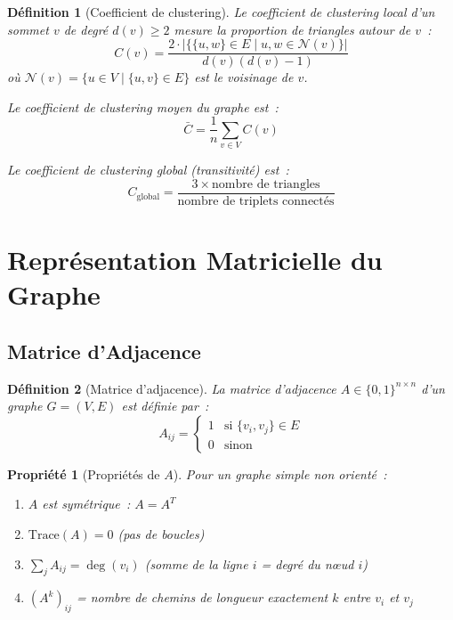 \documentclass[12pt,a4paper]{article}
\newtheorem{definition}{Définition}[section]
\newtheorem{propriete}{Propriété}[section]
\begin{document}
\begin{definition}[Coefficient de clustering]
Le \emph{coefficient de clustering local} d'un sommet $v$ de degré $d(v) \geq 2$ mesure la proportion de triangles autour de $v$~:
\[
    C(v) = \frac{2 \cdot |\{\{u, w\} \in E \mid u, w \in \mathcal{N}(v)\}|}{d(v)(d(v) - 1)}
\]
où $\mathcal{N}(v) = \{u \in V \mid \{u, v\} \in E\}$ est le voisinage de $v$.

Le \emph{coefficient de clustering moyen} du graphe est~:
\[
    \bar{C} = \frac{1}{n} \sum_{v \in V} C(v)
\]

Le \emph{coefficient de clustering global} (transitivité) est~:
\[
    C_{\text{global}} = \frac{3 \times \text{nombre de triangles}}{\text{nombre de triplets connectés}}
\]
\end{definition}

\section{Représentation Matricielle du Graphe}
\label{sec:representation}

\subsection{Matrice d'Adjacence}

\begin{definition}[Matrice d'adjacence]
La \emph{matrice d'adjacence} $A \in \{0, 1\}^{n \times n}$ d'un graphe $G = (V, E)$ est définie par~:
\[
    A_{ij} = \begin{cases}
        1 & \text{si } \{v_i, v_j\} \in E \\
        0 & \text{sinon}
    \end{cases}
\]
\end{definition}

\begin{propriete}[Propriétés de $A$]
Pour un graphe simple non orienté~:
\begin{enumerate}
    \item $A$ est \emph{symétrique}~: $A = A^T$
    \item $\text{Trace}(A) = 0$ (pas de boucles)
    \item $\sum_j A_{ij} = \deg(v_i)$ (somme de la ligne $i$ = degré du n\oe{}ud $i$)
    \item $(A^k)_{ij}$ = nombre de chemins de longueur exactement $k$ entre $v_i$ et $v_j$
\end{enumerate}
\end{propriete}
\end{document}
